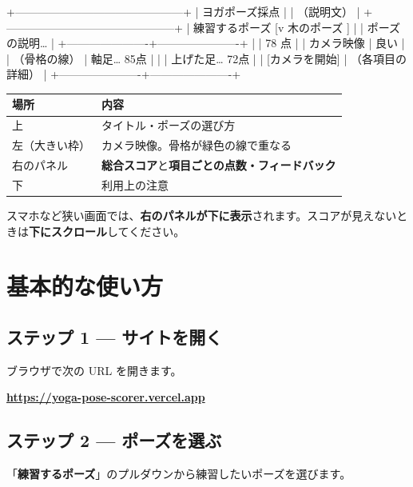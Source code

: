 \documentclass[a4paper,11pt]{ltjsarticle}
\begin{document}
\begin{asciibox}
+---------------------------------------------+
|  ヨガポーズ採点                              |
|  （説明文）                                  |
+---------------------------------------------+
|  練習するポーズ  [v 木のポーズ    ]          |
|  ポーズの説明…                               |
+----------------------+----------------------+
|                      |   78 点              |
|   カメラ映像          |   良い               |
|   （骨格の線）        |   軸足… 85点         |
|                      |   上げた足… 72点     |
|  [カメラを開始]       |   （各項目の詳細）    |
+----------------------+----------------------+
\end{asciibox}

\begin{table}[h]
  \centering
  \begin{tabular}{@{}ll@{}}
    \toprule
    場所 & 内容 \\
    \midrule
    上 & タイトル・ポーズの選び方 \\
    左（大きい枠） & カメラ映像。骨格が緑色の線で重なる \\
    右のパネル & \textbf{総合スコア}と\textbf{項目ごとの点数・フィードバック} \\
    下 & 利用上の注意 \\
    \bottomrule
  \end{tabular}
\end{table}

スマホなど狭い画面では、\textbf{右のパネルが下に表示}されます。スコアが見えないときは\textbf{下にスクロール}してください。

\section{基本的な使い方}

\subsection{ステップ 1 --- サイトを開く}

ブラウザで次の URL を開きます。

\noindent\textbf{\url{https://yoga-pose-scorer.vercel.app}}

\subsection{ステップ 2 --- ポーズを選ぶ}

「\textbf{練習するポーズ}」のプルダウンから練習したいポーズを選びます。
\end{document}
